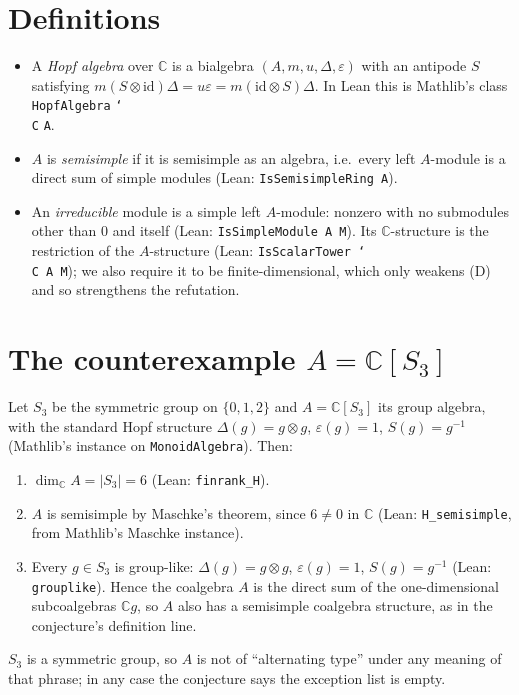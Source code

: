 \documentclass[11pt]{article}
\theoremstyle{definition}
\begin{document}
\section{Definitions}
\begin{itemize}
\item A \emph{Hopf algebra} over $\mathbb{C}$ is a bialgebra $(A,m,u,\Delta,\varepsilon)$ with an
antipode $S$ satisfying $m(S\otimes\mathrm{id})\Delta=u\varepsilon=m(\mathrm{id}\otimes S)\Delta$.
In Lean this is Mathlib's class \texttt{HopfAlgebra} \texttt{\char`\\C} \texttt{A}.
\item $A$ is \emph{semisimple} if it is semisimple as an algebra, i.e.\ every left $A$-module is a
direct sum of simple modules (Lean: \texttt{IsSemisimpleRing A}).
\item An \emph{irreducible} module is a simple left $A$-module: nonzero with no submodules other
than $0$ and itself (Lean: \texttt{IsSimpleModule A M}). Its $\mathbb{C}$-structure is the
restriction of the $A$-structure (Lean: \texttt{IsScalarTower \char`\\C A M}); we also require it
to be finite-dimensional, which only weakens (D) and so strengthens the refutation.
\end{itemize}

\section{The counterexample $A=\mathbb{C}[S_3]$}
Let $S_3$ be the symmetric group on $\{0,1,2\}$ and $A=\mathbb{C}[S_3]$ its group algebra, with
the standard Hopf structure $\Delta(g)=g\otimes g$, $\varepsilon(g)=1$, $S(g)=g^{-1}$ (Mathlib's
instance on \texttt{MonoidAlgebra}). Then:
\begin{enumerate}
\item $\dim_{\mathbb{C}} A=|S_3|=6$ (Lean: \texttt{finrank\_H}).
\item $A$ is semisimple by Maschke's theorem, since $6\neq 0$ in $\mathbb{C}$ (Lean:
\texttt{H\_semisimple}, from Mathlib's Maschke instance).
\item Every $g\in S_3$ is group-like: $\Delta(g)=g\otimes g$, $\varepsilon(g)=1$, $S(g)=g^{-1}$
(Lean: \texttt{grouplike}). Hence the coalgebra $A$ is the direct sum of the one-dimensional
subcoalgebras $\mathbb{C}g$, so $A$ also has a semisimple coalgebra structure, as in the
conjecture's definition line.
\end{enumerate}
$S_3$ is a symmetric group, so $A$ is not of ``alternating type'' under any meaning of that phrase;
in any case the conjecture says the exception list is empty.
\end{document}
